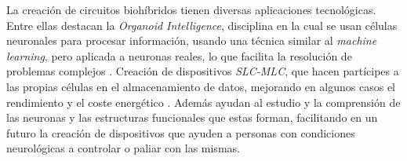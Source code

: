 
La creación de circuitos biohíbridos tienen diversas aplicaciones tecnológicas. Entre ellas destacan la \textit{Organoid Intelligence}, disciplina en la cual se usan células neuronales para procesar información, usando una técnica similar al \textit{machine learning}, pero aplicada a neuronas reales, lo que facilita la resolución de problemas complejos \cite{Smirnova2023}. Creación de dispositivos \textit{SLC-MLC}, que hacen partícipes a las propias células en el almacenamiento de datos, mejorando en algunos casos el rendimiento y el coste energético \cite{Murugan2012}. Además ayudan al estudio y la comprensión de las neuronas y las estructuras funcionales que estas forman, facilitando en un futuro la creación de dispositivos que ayuden a personas con condiciones neurológicas a controlar o paliar con las mismas.
